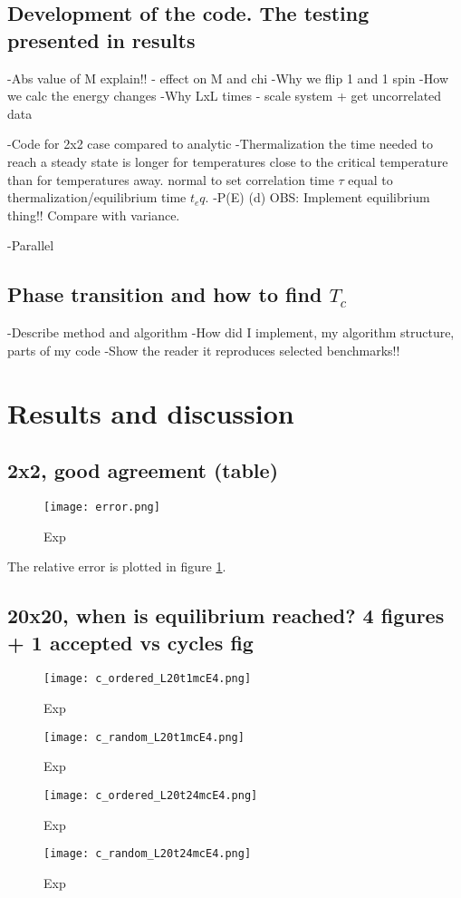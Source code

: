 \documentclass[norsk, 10pt, twocolumn, a4paper]{revtex4}
\begin{document}
\subsection{Development of the code. The testing presented in results}

-Abs value of M explain!! - effect on M and chi
-Why we flip 1 and 1 spin
-How we calc the energy changes
-Why LxL times - scale system + get uncorrelated data


-Code for 2x2 case compared to analytic
-Thermalization
the time needed to reach a steady state is longer for temperatures close
to the critical temperature than for temperatures away.
normal to set correlation time $\tau$ equal to thermalization/equilibrium time $t_eq$.
-P(E) (d) OBS: Implement equilibrium thing!! Compare with variance.

-Parallel

\subsection{Phase transition and how to find $T_c$}



-Describe method and algorithm
-How did I implement, my algorithm structure, parts of my code
-Show the reader it reproduces selected benchmarks!!

\section{Results and discussion}
\subsection{2x2, good agreement (table)}
\begin{figure}
    \texttt{[image: error.png]}
    \caption{
        \label{fig:b1}
        Exp}
\end{figure}
The relative error is plotted in figure \ref{fig:b1}.


\subsection{20x20, when is equilibrium reached? 4 figures + 1 accepted vs cycles fig}
\begin{figure}
    \texttt{[image: c\_ordered\_L20t1mcE4.png]}
    \caption{
        \label{fig:c1}
        Exp}
\end{figure}
\begin{figure}
    \texttt{[image: c\_random\_L20t1mcE4.png]}
    \caption{
        \label{fig:c2}
        Exp}
\end{figure}
\begin{figure}
    \texttt{[image: c\_ordered\_L20t24mcE4.png]}
    \caption{
        \label{fig:c3}
        Exp}
\end{figure}
\begin{figure}
    \texttt{[image: c\_random\_L20t24mcE4.png]}
    \caption{
        \label{fig:c4}
        Exp}
\end{figure}
\end{document}
